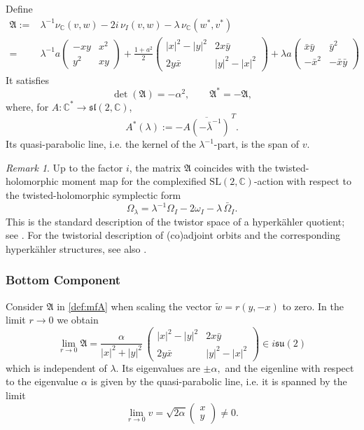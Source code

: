 \documentclass[12pt,a4paper]{amsart}
\theoremstyle{definition}
\theoremstyle{remark}
\newtheorem{remark}[theorem]{Remark}
\newcommand{\C}{\mathbb C}
\begin{document}
Define
\begin{equation}\label{def:mfA}
\begin{split}
\mathfrak A
:=&\lambda^{-1}\nu_\C(v,w)-2i\,\nu_I(v,w)-\lambda\,\nu_\C(w^*,v^*)\\
=&\lambda^{-1}a\begin{pmatrix}-xy& x^2\\y^2&xy \end{pmatrix}
+\frac{1 + a^2}{2}\begin{pmatrix}|x|^2-|y|^2& 2x\bar y\\ 2y\bar x& |y|^2-|x|^2 \end{pmatrix}
+\lambda a\begin{pmatrix} \bar x \bar y &\bar y^2\\-\bar x^2&-\bar x\bar y  \end{pmatrix}
\end{split}
\end{equation}
It satisfies
\begin{equation}\label{eq:SDforRes}
\det(\mathfrak A)=-\alpha^2,
\qquad
\mathfrak A^*=-\mathfrak A,
\end{equation}
where, for $A\colon\C^*\to\mathfrak{sl}(2,\C)$,
\begin{equation}\label{defstar}
A^*(\lambda):=-\overline{A(-\bar\lambda^{-1})}^{\,T}.
\end{equation}
Its quasi-parabolic line, i.e. the kernel of the $\lambda^{-1}$-part,  is the span of $v.$
\begin{remark}\label{rem:twisted}
Up to the factor $i$, the matrix $\mathfrak A$ coincides with the twisted-holomorphic
moment map for the complexified $\mathrm{SL}(2,\C)$-action with respect to the
twisted-holomorphic symplectic form
\[
\Omega_\lambda=\lambda^{-1}\Omega_I-2\omega_I-\lambda\,\bar\Omega_I.
\]
This is the standard description of the twistor space of a hyperk\"ahler quotient;
see \cite{HKLR}. For the  twistorial description of (co)adjoint orbits
and the corresponding hyperk\"ahler structures, see also \cite{Biquard98}.
\end{remark}

\subsubsection{Bottom Component}\label{rem:Scaling}
Consider $\mathfrak A$ in \eqref{def:mfA} when
scaling the vector $\tilde w= r(y,-  x)$ to zero. In the limit 
$r\to0$  we obtain
\[\lim_{r\to0}\mathfrak A= \frac{\alpha}{|x|^2+|y|^2}\,
\begin{pmatrix}|x|^2-|y|^2&2x\bar y\\2 y\bar x&|y|^2-|x|^2
 \end{pmatrix}
\in i\mathfrak{su}(2)\]
which is independent of $\lambda.$ Its eigenvalues are $\pm\alpha,$ and the eigenline with respect to the eigenvalue $\alpha$ is 
given by  the quasi-parabolic line, i.e. it is spanned by the limit 
\[\lim_{r\to0}v=\sqrt{2\alpha}
\begin{pmatrix}x\\y\end{pmatrix}\neq0.\] 
\end{document}

